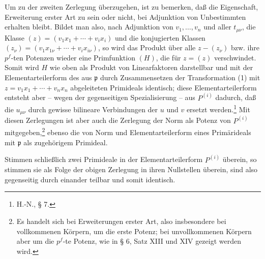 \documentclass[11pt]{article}
\providecommand{\frakp}{\mathfrak p}
\begin{document}
Um zu der zweiten Zerlegung überzugehen, ist zu bemerken, daß die Eigenschaft, Erweiterung erster Art zu sein oder nicht, bei Adjunktion von Unbestimmten erhalten bleibt. Bildet man also, nach Adjunktion von $v_1,\ldots,v_n$ und aller $t_{\mu\nu}$, die Klasse $(z)=(v_1x_1+\cdots+v_ix_i)$ und die konjugierten Klassen $(z_\nu)=(v_1x_{1\nu}+\cdots+v_ix_{i\nu})$, so wird das Produkt über alle $z-(z_\nu)$ bzw. ihre $p^f$-ten Potenzen wieder eine Primfunktion $(H)$, die für $z=(z)$ verschwindet. Somit wird $H$ wie oben als Produkt von Linearfaktoren darstellbar und mit der Elementarteilerform des aus $\frakp$ durch Zusammensetzen der Transformation (1) mit $z=v_1x_1+\cdots+v_nx_n$ abgeleiteten Primideals identisch; diese Elementarteilerform entsteht aber -- wegen der gegenseitigen Spezialisierung -- aus $P^{(i)}$ dadurch, daß die $u_{\mu\nu}$ durch gewisse bilineare Verbindungen der $u$ und $v$ ersetzt werden.\footnote{H.-N., § 7.} Mit diesen Zerlegungen ist aber auch die Zerlegung der Norm als Potenz von $P^{(i)}$ mitgegeben,\footnote{Es handelt sich bei Erweiterungen erster Art, also insbesondere bei vollkommenen Körpern, um die erste Potenz; bei unvollkommenen Körpern aber um die $p^f$-te Potenz, wie in § 6, Satz XIII und XIV gezeigt werden wird.} ebenso die von Norm und Elementarteilerform eines Primärideals mit $\frakp$ als zugehörigem Primideal.

Stimmen schließlich zwei Primideale in der Elementarteilerform $P^{(i)}$ überein, so stimmen sie als Folge der obigen Zerlegung in ihren Nullstellen überein, sind also gegenseitig durch einander teilbar und somit identisch.
\end{document}
